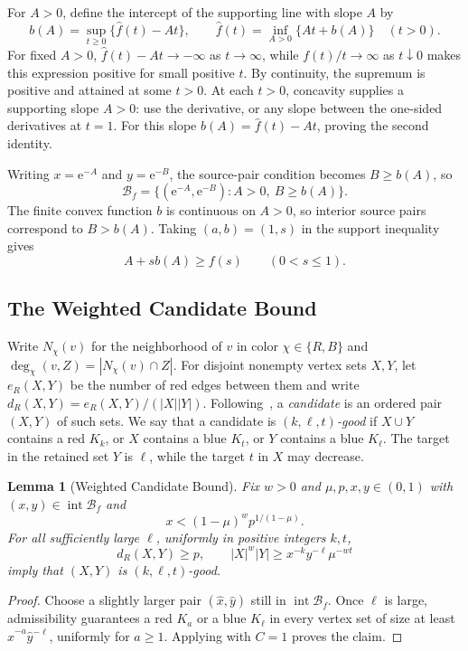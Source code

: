 \documentclass[11pt]{article}
\newtheorem{lemma}{Lemma}[section]
\theoremstyle{definition}
\newcommand{\e}{\mathrm e}
\newcommand{\BB}{\mathcal B}
\begin{document}
For $A>0$, define the intercept of the supporting line with slope $A$ by
\begin{equation}\label{eq:dual}
 b(A)=\sup_{t\ge0}\{\widehat f(t)-At\},\qquad
 \widehat f(t)=\inf_{A>0}\{At+b(A)\}\quad(t>0).
\end{equation}
For fixed $A>0$, $\widehat f(t)-At\to-\infty$ as $t\to\infty$, while $f(t)/t\to\infty$ as $t\downarrow0$ makes this expression positive for small positive $t$.
By continuity, the supremum is positive and attained at some $t>0$.
At each $t>0$, concavity supplies a supporting slope $A>0$: use the derivative, or any slope between the one-sided derivatives at $t=1$.
For this slope $b(A)=\widehat f(t)-At$, proving the second identity.


Writing $x=\e^{-A}$ and $y=\e^{-B}$, the source-pair condition becomes $B\ge b(A)$, so
\[
 \BB_f=\{(\e^{-A},\e^{-B}): A>0,\ B\ge b(A)\}.
\]
The finite convex function $b$ is continuous on $A>0$, so interior source pairs correspond to $B>b(A)$.
Taking $(a,b)=(1,s)$ in the support inequality gives
\begin{equation}\label{eq:support-lower}
 A+s b(A)\ge f(s)\qquad(0<s\le1).
\end{equation}

\subsection{The Weighted Candidate Bound}\label{sec:candidate}
Write $N_\chi(v)$ for the neighborhood of $v$ in color $\chi\in\{R,B\}$ and $\deg_\chi(v,Z)=|N_\chi(v)\cap Z|$.
For disjoint nonempty vertex sets $X,Y$, let $e_R(X,Y)$ be the number of red edges between them and write $d_R(X,Y)=e_R(X,Y)/(|X||Y|)$.
Following~\cite{GNNW}, a \emph{candidate} is an ordered pair $(X,Y)$ of such sets.
We say that a candidate is \emph{$(k,\ell,t)$-good} if $X\cup Y$ contains a red $K_k$, or $X$ contains a blue $K_t$, or $Y$ contains a blue $K_\ell$.
The target in the retained set $Y$ is $\ell$, while the target $t$ in $X$ may decrease.

\begin{lemma}[Weighted Candidate Bound]\label{prop:candidate}
Fix $w>0$ and $\mu,p,x,y\in(0,1)$ with $(x,y)\in\operatorname{int}\BB_f$ and
\[
 x<(1-\mu)^w p^{1/(1-\mu)}.
\]
For all sufficiently large $\ell$, uniformly in positive integers $k,t$,
\[
 d_R(X,Y)\ge p,\qquad
 |X|^w|Y|\ge x^{-k}y^{-\ell}\mu^{-wt}
\]
imply that $(X,Y)$ is $(k,\ell,t)$-good.
\end{lemma}
\begin{proof}
Choose a slightly larger pair $(\widehat x,\widehat y)$ still in $\operatorname{int}\BB_f$.
Once $\ell$ is large, admissibility guarantees a red $K_a$ or a blue $K_\ell$ in every vertex set of size at least $\widehat x^{-a}\widehat y^{-\ell}$, uniformly for $a\ge1$.
Applying  with $C=1$ proves the claim.
\end{proof}
\end{document}
